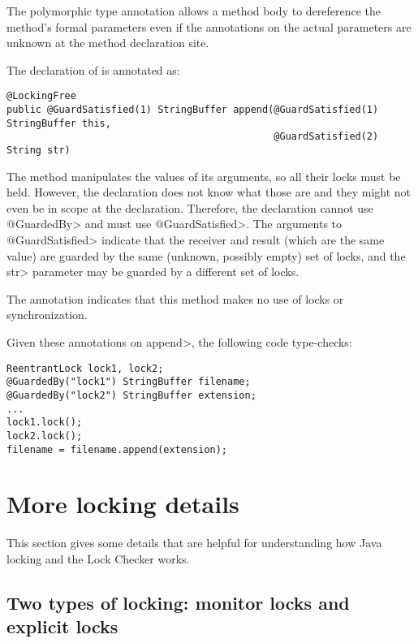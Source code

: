 The polymorphic  type annotation allows a method body
to dereference the method's formal parameters even if the
 annotations on the actual parameters are unknown at
the method declaration site.

The declaration of
is annotated as:

\begin{verbatim}
@LockingFree
public @GuardSatisfied(1) StringBuffer append(@GuardSatisfied(1) StringBuffer this,
                                              @GuardSatisfied(2) String str)
\end{verbatim}

The method manipulates the values of its arguments, so all their locks must
be held.  However, the declaration does not know what those are and they
might not even be in scope at the declaration.  Therefore, the declaration
cannot use \<@GuardedBy> and must use \<@GuardSatisfied>.  The arguments to
\<@GuardSatisfied> indicate that the receiver and result (which are the
same value) are guarded by the same (unknown, possibly empty) set of locks,
and the \<str> parameter may be guarded by a different set of locks.

The  annotation indicates that 
this method makes no use of
locks or synchronization.

Given these annotations on \<append>, the following code type-checks:

\begin{verbatim}
ReentrantLock lock1, lock2;
@GuardedBy("lock1") StringBuffer filename;
@GuardedBy("lock2") StringBuffer extension;
...
lock1.lock();
lock2.lock();
filename = filename.append(extension);
\end{verbatim}




\section{More locking details\label{lock-details}}

This section gives some details that are helpful for understanding how Java
locking and the Lock Checker works.

\subsection{Two types of locking:  monitor locks and explicit locks\label{lock-two-types}}

